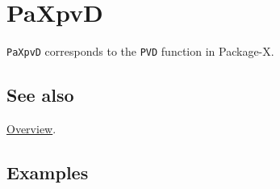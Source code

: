 \documentclass[../FeynHelpersManual.tex]{subfiles}
\begin{document}
\hypertarget{paxpvd}{
\section{PaXpvD}\label{paxpvd}}

\texttt{PaXpvD} corresponds to the \texttt{PVD} function in Package-X.

\subsection{See also}

\hyperlink{toc}{Overview}.

\subsection{Examples}
\end{document}
